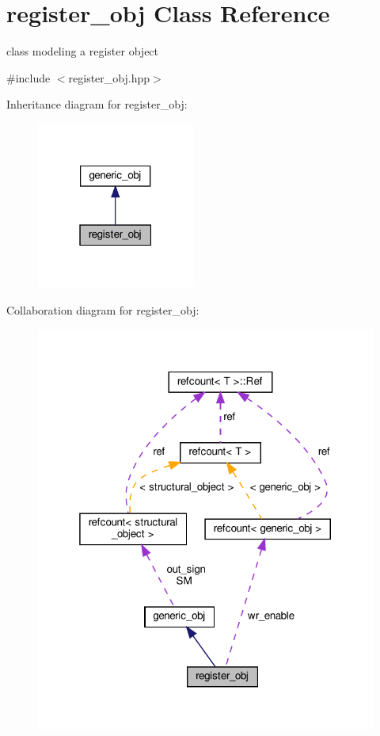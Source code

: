 \hypertarget{classregister__obj}{}\section{register\+\_\+obj Class Reference}
\label{classregister__obj}


class modeling a register object  




{\ttfamily \#include $<$register\+\_\+obj.\+hpp$>$}



Inheritance diagram for register\+\_\+obj\+:
\nopagebreak
\begin{figure}[H]
\begin{center}
\leavevmode
\includegraphics[width=147pt]{d1/da4/classregister__obj__inherit__graph}
\end{center}
\end{figure}


Collaboration diagram for register\+\_\+obj\+:
\nopagebreak
\begin{figure}[H]
\begin{center}
\leavevmode
\includegraphics[width=319pt]{db/da5/classregister__obj__coll__graph}
\end{center}
\end{figure}
